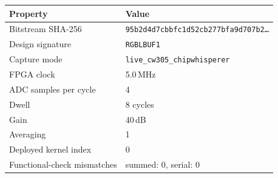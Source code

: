 \begin{tabular}{ll}
\hline
Property & Value \\
\hline
Bitstream SHA-256 & \texttt{95b2d4d7cbbfc1d52cb277bfa9d707b2\ldots} \\
Design signature & \texttt{RGBLBUF1} \\
Capture mode & \texttt{live\_cw305\_chipwhisperer} \\
FPGA clock & 5.0\,MHz \\
ADC samples per cycle & 4 \\
Dwell & 8 cycles \\
Gain & 40\,dB \\
Averaging & 1 \\
Deployed kernel index & 0 \\
Functional-check mismatches & summed: 0, serial: 0 \\
\hline
\end{tabular}
